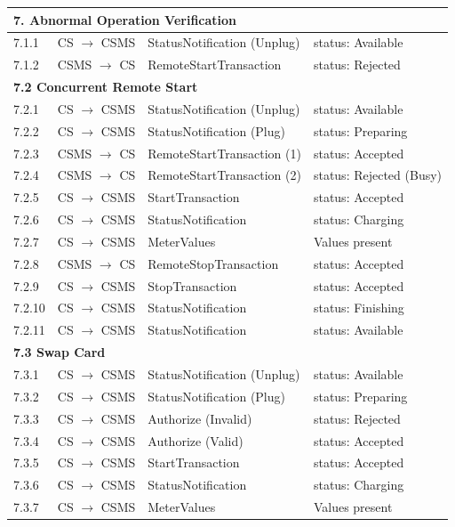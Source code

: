 \documentclass[a4paper,11pt]{report}
\begin{document}
\begin{footnotesize}
\begin{longtable}{|p{1.2cm}|p{2.5cm}|p{5.5cm}|p{6cm}|}
\multicolumn{4}{|l|}{\textbf{7. Abnormal Operation Verification}} \\
\hline
7.1.1 & CS $\to$ CSMS & StatusNotification (Unplug) & status: Available \\
\hline
7.1.2 & CSMS $\to$ CS & RemoteStartTransaction & status: Rejected \\
\hline
\multicolumn{4}{|l|}{\textbf{7.2 Concurrent Remote Start}} \\
\hline
7.2.1 & CS $\to$ CSMS & StatusNotification (Unplug) & status: Available \\
\hline
7.2.2 & CS $\to$ CSMS & StatusNotification (Plug) & status: Preparing \\
\hline
7.2.3 & CSMS $\to$ CS & RemoteStartTransaction (1) & status: Accepted \\
\hline
7.2.4 & CSMS $\to$ CS & RemoteStartTransaction (2) & status: Rejected (Busy) \\
\hline
7.2.5 & CS $\to$ CSMS & StartTransaction & status: Accepted \\
\hline
7.2.6 & CS $\to$ CSMS & StatusNotification & status: Charging \\
\hline
7.2.7 & CS $\to$ CSMS & MeterValues & Values present \\
\hline
7.2.8 & CSMS $\to$ CS & RemoteStopTransaction & status: Accepted \\
\hline
7.2.9 & CS $\to$ CSMS & StopTransaction & status: Accepted \\
\hline
7.2.10 & CS $\to$ CSMS & StatusNotification & status: Finishing \\
\hline
7.2.11 & CS $\to$ CSMS & StatusNotification & status: Available \\
\hline
\multicolumn{4}{|l|}{\textbf{7.3 Swap Card}} \\
\hline
7.3.1 & CS $\to$ CSMS & StatusNotification (Unplug) & status: Available \\
\hline
7.3.2 & CS $\to$ CSMS & StatusNotification (Plug) & status: Preparing \\
\hline
7.3.3 & CS $\to$ CSMS & Authorize (Invalid) & status: Rejected \\
\hline
7.3.4 & CS $\to$ CSMS & Authorize (Valid) & status: Accepted \\
\hline
7.3.5 & CS $\to$ CSMS & StartTransaction & status: Accepted \\
\hline
7.3.6 & CS $\to$ CSMS & StatusNotification & status: Charging \\
\hline
7.3.7 & CS $\to$ CSMS & MeterValues & Values present \\

\end{longtable}
\end{footnotesize}
\end{document}
